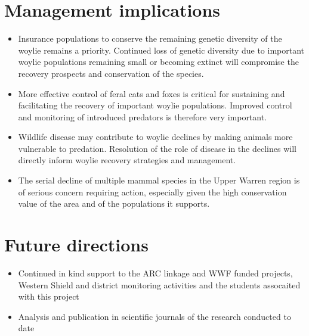 \documentclass[version=last, paper=a4, DIV=18, usenames, dvipsnames]{scrartcl}
\begin{document}
\section*{Management implications}
\begin{itemize}
\itemsep1pt\parskip0pt
\item
  Insurance populations to conserve the remaining genetic diversity of
  the woylie remains a priority. Continued loss of genetic diversity due
  to important woylie populations remaining small or becoming extinct
  will compromise the recovery prospects and conservation of the
  species.
\item
  More effective control of feral cats and foxes is critical for
  sustaining and facilitating the recovery of important woylie
  populations. Improved control and monitoring of introduced predators
  is therefore very important.
\item
  Wildlife disease may contribute to woylie declines by making animals
  more vulnerable to predation. Resolution of the role of disease in the
  declines will directly inform woylie recovery strategies and
  management.
\item
  The serial decline of multiple mammal species in the Upper Warren
  region is of serious concern requiring action, especially given the
  high conservation value of the area and of the populations it
  supports.
\end{itemize}



\section*{Future directions}
\begin{itemize}
\itemsep1pt\parskip0pt
\item
  Continued in kind support to the ARC linkage and WWF funded projects,
  Western Shield and district monitoring activities and the students
  assocaited with this project
\item
  Analysis and publication in scientific journals of the research
  conducted to date
\end{itemize}




\clearpage
\end{document}
